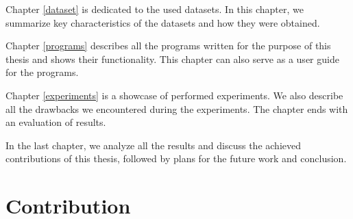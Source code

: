 Chapter \ref{dataset} is dedicated to the used datasets. In this chapter, we summarize key characteristics of the datasets and how they were obtained.

Chapter \ref{programs} describes all the programs written for the purpose of this thesis and shows their functionality. This chapter can also serve as a user guide for the programs.

Chapter \ref{experiments} is a showcase of performed experiments. We also describe all the drawbacks we encountered during the experiments. The chapter ends with an evaluation of results.

In the last chapter, we analyze all the results and discuss the achieved contributions of this thesis, followed by plans for the future work and conclusion.

\section{Contribution}
